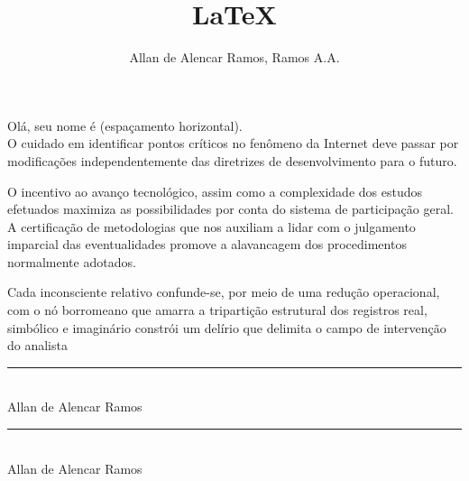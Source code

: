 \documentclass[12pt, a4paper, oneside]{book}
\begin{document}
\title{LaTeX}
\author{Allan de Alencar Ramos, Ramos A.A.} 
\maketitle

Olá, seu nome é \hspace{2cm} (espaçamento horizontal).\\

O cuidado em identificar pontos críticos no fenômeno da Internet deve passar por modificações independentemente das diretrizes de desenvolvimento para o futuro.

\hrulefill

O incentivo ao avanço tecnológico, assim como a complexidade dos estudos efetuados maximiza as possibilidades por conta do sistema de participação geral.\\

A certificação de metodologias que nos auxiliam a lidar com o julgamento imparcial das eventualidades promove a alavancagem dos procedimentos normalmente adotados.

\dotfill

Cada inconsciente relativo confunde-se, por meio de uma redução operacional, com o nó borromeano que amarra a tripartição estrutural dos registros real, simbólico e imaginário constrói um delírio que delimita o campo de intervenção do analista

\newpage
\begin{center}

\rule{10cm}{0.02cm}\\
Allan de Alencar Ramos

\vspace{2cm}

\rule{10cm}{0.02cm}\\
Allan de Alencar Ramos

\end{center}
\end{document}
